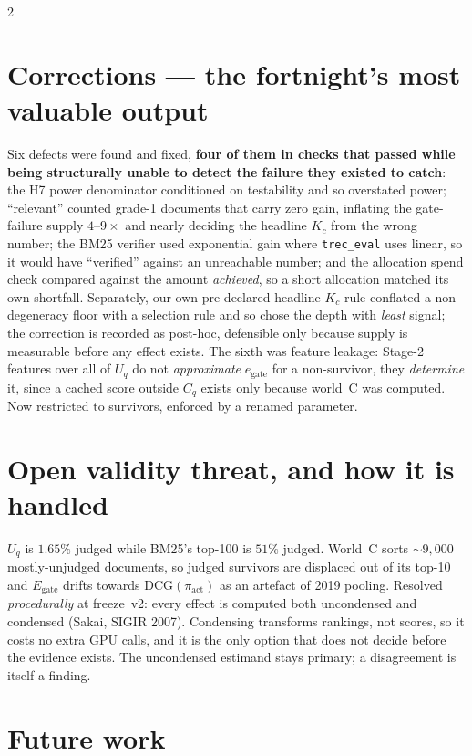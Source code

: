\documentclass[10pt,a4paper]{article}
\newcommand{\Uq}{U_q}
\newcommand{\Kc}{K_c}
\begin{document}
\begin{multicols}{2}
\section{Corrections --- the fortnight's most valuable output}

Six defects were found and fixed, \textbf{four of them in checks that passed
while being structurally unable to detect the failure they existed to catch}: the H7 power denominator conditioned on testability and so overstated
power; ``relevant'' counted grade-1 documents that carry zero gain, inflating
the gate-failure supply $4$--$9\times$ and nearly deciding the headline $\Kc$
from the wrong number; the BM25 verifier used exponential gain where \texttt{trec\_eval} uses linear,
so it would have ``verified'' against an unreachable number; and the allocation
spend check compared against the amount \emph{achieved}, so a short allocation
matched its own shortfall.
Separately, our own pre-declared headline-$\Kc$ rule conflated a non-degeneracy
floor with a selection rule and so chose the depth with \emph{least} signal; the
correction is recorded as post-hoc, defensible only because supply is measurable
before any effect exists. The sixth was feature leakage: Stage-2 features over
all of $\Uq$ do not \emph{approximate} $e_{\text{gate}}$ for a non-survivor,
they \emph{determine} it, since a cached score outside $C_q$ exists only
because world~C was computed. Now restricted to survivors, enforced by a
renamed parameter.

\section{Open validity threat, and how it is handled}

$\Uq$ is $1.65\%$ judged while BM25's top-100 is $51\%$ judged. World~C sorts
${\sim}9{,}000$ mostly-unjudged documents, so judged survivors are displaced out
of its top-10 and $E_{\text{gate}}$ drifts towards
$\mathrm{DCG}(\pi_{\text{act}})$ as an artefact of 2019 pooling. Resolved \emph{procedurally} at freeze~v2: every effect is computed both
uncondensed and condensed (Sakai, SIGIR 2007). Condensing transforms rankings,
not scores, so it costs no extra GPU calls, and it is the only option that does
not decide before the evidence exists. The uncondensed estimand stays primary;
a disagreement is itself a finding.

\section{Future work}


\end{multicols}
\end{document}
